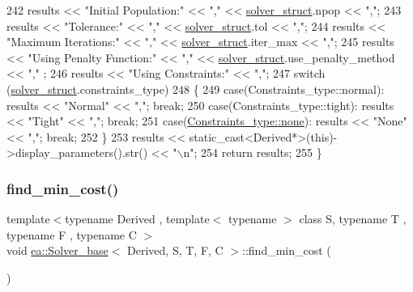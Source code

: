 \begin{DoxyCode}
242         results << \textcolor{stringliteral}{"Initial Population:"} << \textcolor{stringliteral}{","} << \hyperlink{classea_1_1_solver__base_a5e1d821809f2d26c6f882942ad728127}{solver\_struct}.npop << \textcolor{stringliteral}{","};
243         results << \textcolor{stringliteral}{"Tolerance:"} << \textcolor{stringliteral}{","} << \hyperlink{classea_1_1_solver__base_a5e1d821809f2d26c6f882942ad728127}{solver\_struct}.tol << \textcolor{stringliteral}{","};
244         results << \textcolor{stringliteral}{"Maximum Iterations:"} << \textcolor{stringliteral}{","} << \hyperlink{classea_1_1_solver__base_a5e1d821809f2d26c6f882942ad728127}{solver\_struct}.iter\_max << \textcolor{stringliteral}{","};
245         results << \textcolor{stringliteral}{"Using Penalty Function:"} << \textcolor{stringliteral}{","} << \hyperlink{classea_1_1_solver__base_a5e1d821809f2d26c6f882942ad728127}{solver\_struct}.use\_penalty\_method << \textcolor{stringliteral}{","}
      ;
246         results << \textcolor{stringliteral}{"Using Constraints:"} << \textcolor{stringliteral}{","};
247         \textcolor{keywordflow}{switch} (\hyperlink{classea_1_1_solver__base_a5e1d821809f2d26c6f882942ad728127}{solver\_struct}.constraints\_type)
248         \{
249         \textcolor{keywordflow}{case}(Constraints\_type::normal): results << \textcolor{stringliteral}{"Normal"} << \textcolor{stringliteral}{","}; \textcolor{keywordflow}{break};
250         \textcolor{keywordflow}{case}(Constraints\_type::tight): results << \textcolor{stringliteral}{"Tight"} << \textcolor{stringliteral}{","}; \textcolor{keywordflow}{break};
251         \textcolor{keywordflow}{case}(\hyperlink{namespaceea_a8e369877773b4db67b8512efdb4f8f89a334c4a4c42fdb79d7ebc3e73b517e6f8}{Constraints\_type::none}): results << \textcolor{stringliteral}{"None"} << \textcolor{stringliteral}{","}; \textcolor{keywordflow}{break};
252         \}
253         results << static\_cast<Derived*>(\textcolor{keyword}{this})->display\_parameters().str() << \textcolor{stringliteral}{"\(\backslash\)n"};
254         \textcolor{keywordflow}{return} results;
255     \}
\end{DoxyCode}
\mbox{\label{classea_1_1_solver__base_ac69a6c714298054039acbbbf5d2eea23}} 
\subsubsection{\texorpdfstring{find\+\_\+min\+\_\+cost()}{find\_min\_cost()}}
{\footnotesize\ttfamily template$<$typename Derived , template$<$ typename $>$ class S, typename T , typename F , typename C $>$ \\
void \hyperlink{classea_1_1_solver__base}{ea\+::\+Solver\+\_\+base}$<$ Derived, S, T, F, C $>$\+::find\+\_\+min\+\_\+cost (\begin{DoxyParamCaption}{ }\end{DoxyParamCaption})\hspace{0.3cm}{\ttfamily [protected]}}



